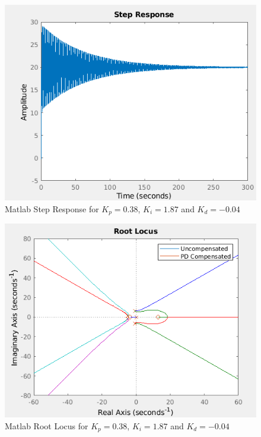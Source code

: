 \documentclass[a4paper, 11pt, compsoc]{IEEEtran}
\begin{document}
				\begin{figure}[!ht]
					\centering
					\includegraphics[width=\columnwidth]{lab6pidmatlabStep.png}
					\caption{Matlab Step Response for $K_p = 0.38$, $K_i = 1.87$ and $K_d = -0.04$}
					\label{fig:lab6pidmatlabStep}
				\end{figure}

				\begin{figure}[!ht]
					\centering
					\includegraphics[width=\columnwidth]{lab6pidmatlabrl.png}
					\caption{Matlab Root Locus for $K_p = 0.38$, $K_i = 1.87$ and $K_d = -0.04$}
					\label{fig:lab6pidmatlabrl}
				\end{figure}
\end{document}
